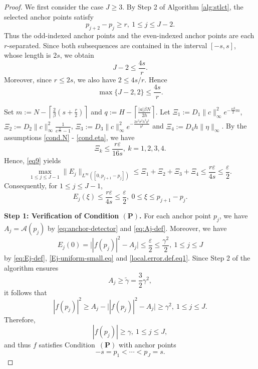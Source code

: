 \documentclass[11pt, reqno]{amsart}
\numberwithin{equation}{section}
\begin{document}
\begin{proof}
We first consider the case $J\ge 3$. By Step 2 of Algorithm \ref{alg:stlct}, the selected anchor points satisfy
$$ p_{j+2}-p_j\ge r, \  1\le j\le J-2.$$ 
Thus the odd-indexed anchor points and the even-indexed anchor points are each $r$-separated. Since both subsequences are contained in the interval $[-s,s]$, whose length is $2s$, we obtain
$$ J-2\le \frac{4s}{r}.$$ 
Moreover, since $r\le 2s$, we also have $2\le 4s/r$. Hence
\begin{equation}\label{J-bound.eq}
\max\{J-2,2\}\le \frac{4s}{r}.
\end{equation}

Set $ m:=N-\left\lceil \frac{2}{\beta}\left(s+\frac{r}{2}\right)\right\rceil$ and  $
q:=H-\left\lceil \frac{|a|\beta N}{2h}\right\rceil.$ 
Let $\Xi_1:= D_1\|c\|_\infty^2 e^{-\frac{\nu\beta}{2}m} $, $\Xi_2:= D_2\|c\|_\infty^2\frac{1}{e^{\frac{b}{\sigma h}}  -  1}$, $\Xi_3:= D_3\|c\|_\infty^2 e^{-\frac{2\pi^2\sigma^2 h^2 q^2}{b^2}}$ and $\Xi_4:= D_4 h\|\eta\|_\infty$.
By the assumptions \eqref{cond.N} - \eqref{cond.eta}, we have
 $$\Xi_k\le \frac{r\varepsilon}{16s}, \  k=1,2,3,4.$$ 
Hence,  \eqref{eq9} yields
\begin{equation}\label{Ej-uniform-small.eq}
\max_{1\le j\le J-1}\|E_j\|_{L^\infty([0,p_{j+1}-p_j])} 
\le \Xi_1 + \Xi_2 + \Xi_3 + \Xi_4 \le \frac{r\varepsilon}{4s} \le \frac{\varepsilon}{2}.
\end{equation}
Consequently,  for $1\le j\le J-1$, 
$$ E_j(\xi)\le \frac{r\varepsilon}{4s} \le \frac{\varepsilon}{2},  \ 0\le \xi\le p_{j+1}-p_j. $$


\smallskip
\noindent\textbf{Step 1: Verification of Condition $(\mathbf P)$.} 
For each anchor point $p_j$, we have $A_j=\mathcal A(p_j)$  by \eqref{eq:anchor-detector} and \eqref{eq:Aj-def}. 
Moreover, we have 
$$ E_j(0)=\bigl||f(p_j)|^2-A_j\bigr| \le \frac{\varepsilon}{2}\le \frac{\gamma^2}{2}, \ 1\le j\le J$$
by \eqref{eq:Ej-def}, \eqref{Ej-uniform-small.eq} and \eqref{local.error.def.eq1}. 
Since Step 2 of the algorithm ensures
$$ A_j\ge \widetilde\gamma=\frac{3}{2}\gamma^2, $$
it follows that
$$ |f(p_j)|^2\ge A_j - \bigl||f(p_j)|^2-A_j\bigr| \ge \gamma^2, \ 1\le j\le J.$$ 
Therefore,
$$ |f(p_j)|\ge \gamma, \ 1\le j\le J,$$
and thus $f$ satisfies Condition~$(\mathbf P)$ with anchor points
$$ -s=p_1<\cdots<p_J=s.$$



\end{proof}
\end{document}
